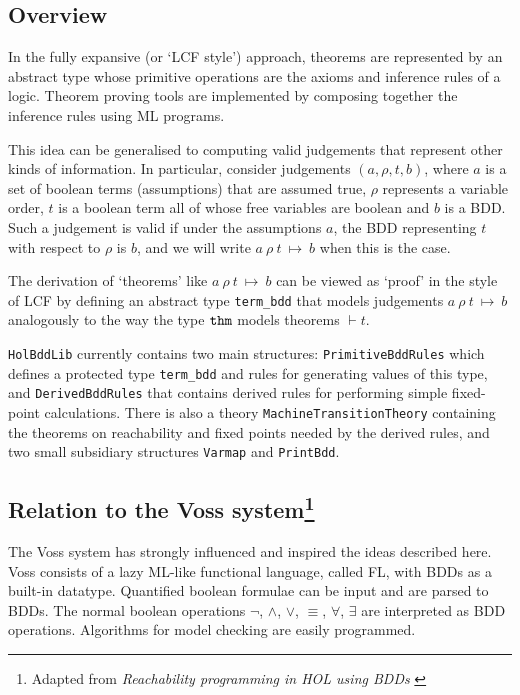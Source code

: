 \documentclass[12pt]{article}
\renewcommand{\t}[1]{\mbox{\tt #1}}
\newcommand{\ty}[1]{\mbox{\tt #1}}
\newcommand{\termbdd}[4]{\mbox{$#1~#2~#3~\mapsto~#4$}}
\newcommand\termbddty{\texttt{term\_bdd}\xspace}
\begin{document}
\subsection*{Overview}


In the fully expansive (or `LCF style') approach, theorems are represented by an abstract type
whose primitive operations are the axioms and inference rules of a
logic.  Theorem proving tools are implemented by composing together
the inference rules using ML programs.

This idea can be generalised to computing valid judgements that
represent other kinds of information. In particular, consider
judgements $(a,\rho,t,b)$, where $a$ is a set of boolean terms
(assumptions) that are assumed true, $\rho$ represents a variable
order, $t$ is a boolean term all of whose free variables are boolean
and $b$ is a BDD. Such a judgement is valid if under the assumptions
$a$, the BDD representing $t$ with respect to $\rho$ is $b$, and we
will write \termbdd{a}{\rho}{t}{b} when this is the case.

The derivation of `theorems' like \termbdd{a}{\rho}{t}{b} can be viewed
as `proof' in the style of LCF by defining an abstract type \termbddty{}
that models
judgements $\termbdd{a}{\rho}{t}{b}$ analogously
to the way the type $\ty{thm}$ models theorems $\vdash t$.

\t{HolBddLib} currently contains two main structures: \t{PrimitiveBddRules}
which defines a protected type \termbddty and rules for generating
values of this type, and \t{DerivedBddRules} that contains derived
rules for performing simple fixed-point calculations.  There is also a
theory \t{MachineTransitionTheory} containing the theorems on
reachability and fixed points needed by the derived rules,
and two small subsidiary structures \t{Varmap} and \t{PrintBdd}.


\subsection*{Relation to the Voss system\footnote{Adapted from 
{\it Reachability programming in HOL using BDDs}
\cite{tphols2000-Gordon}}}\label{related}

The Voss system \cite{SegerVoss} has strongly influenced and inspired
the ideas described here. Voss consists of a lazy
ML-like functional language, called FL, with BDDs as a built-in datatype.
Quantified boolean formulae can be input and are parsed to BDDs.
The normal boolean operations $\neg$, $\wedge$, $\vee$, $\equiv$,
$\forall$, $\exists$ are interpreted as BDD operations.  
Algorithms for model checking are easily programmed.
\end{document}
